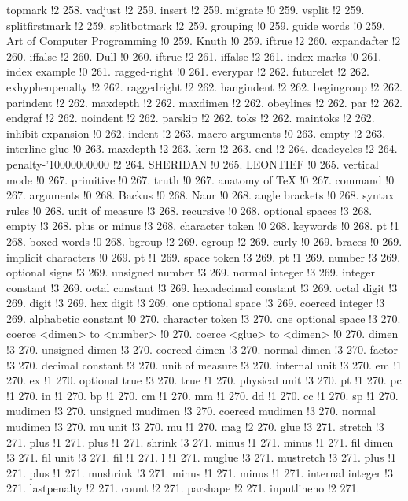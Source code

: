 topmark !2 258.
vadjust !2 259.
insert !2 259.
migrate !0 259.
vsplit !2 259.
splitfirstmark !2 259.
splitbotmark !2 259.
grouping !0 259.
guide words !0 259.
Art of Computer Programming !0 259.
Knuth !0 259.
iftrue !2 260.
expandafter !2 260.
iffalse !2 260.
Dull !0 260.
iftrue !2 261.
iffalse !2 261.
index marks !0 261.
index example !0 261.
ragged-right !0 261.
everypar !2 262.
futurelet !2 262.
exhyphenpenalty !2 262.
raggedright !2 262.
hangindent !2 262.
begingroup !2 262.
parindent !2 262.
maxdepth !2 262.
maxdimen !2 262.
obeylines !2 262.
par !2 262.
endgraf !2 262.
noindent !2 262.
parskip !2 262.
toks !2 262.
maintoks !2 262.
inhibit expansion !0 262.
indent !2 263.
macro arguments !0 263.
empty !2 263.
interline glue !0 263.
maxdepth !2 263.
kern !2 263.
end !2 264.
deadcycles !2 264.
penalty-'10000000000 !2 264.
SHERIDAN !0 265.
LEONTIEF !0 265.
vertical mode !0 267.
primitive !0 267.
truth !0 267.
anatomy of TeX !0 267.
command !0 267.
arguments !0 268.
Backus !0 268.
Naur !0 268.
angle brackets !0 268.
syntax rules !0 268.
unit of measure !3 268.
recursive !0 268.
optional spaces !3 268.
empty !3 268.
plus or minus !3 268.
character token !0 268.
keywords !0 268.
pt !1 268.
boxed words !0 268.
bgroup !2 269.
egroup !2 269.
curly !0 269.
braces !0 269.
implicit characters !0 269.
pt !1 269.
space token !3 269.
pt !1 269.
number !3 269.
optional signs !3 269.
unsigned number !3 269.
normal integer !3 269.
integer constant !3 269.
octal constant !3 269.
hexadecimal constant !3 269.
octal digit !3 269.
digit !3 269.
hex digit !3 269.
one optional space !3 269.
coerced integer !3 269.
alphabetic constant !0 270.
character token !3 270.
one optional space !3 270.
coerce <dimen> to <number> !0 270.
coerce <glue> to <dimen> !0 270.
dimen !3 270.
unsigned dimen !3 270.
coerced dimen !3 270.
normal dimen !3 270.
factor !3 270.
decimal constant !3 270.
unit of measure !3 270.
internal unit !3 270.
em !1 270.
ex !1 270.
optional {\fam \ttfam \ninett true} !3 270.
true !1 270.
physical unit !3 270.
pt !1 270.
pc !1 270.
in !1 270.
bp !1 270.
cm !1 270.
mm !1 270.
dd !1 270.
cc !1 270.
sp !1 270.
mudimen !3 270.
unsigned mudimen !3 270.
coerced mudimen !3 270.
normal mudimen !3 270.
mu unit !3 270.
mu !1 270.
mag !2 270.
glue !3 271.
stretch !3 271.
plus !1 271.
plus !1 271.
shrink !3 271.
minus !1 271.
minus !1 271.
fil dimen !3 271.
fil unit !3 271.
fil !1 271.
l !1 271.
muglue !3 271.
mustretch !3 271.
plus !1 271.
plus !1 271.
mushrink !3 271.
minus !1 271.
minus !1 271.
internal integer !3 271.
lastpenalty !2 271.
count !2 271.
parshape !2 271.
inputlineno !2 271.
